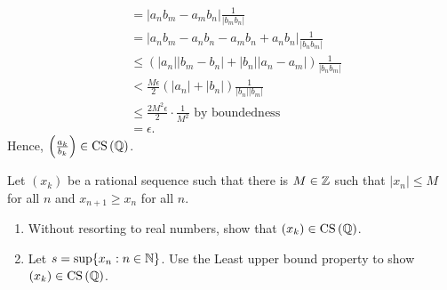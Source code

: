 \documentclass[a4paper]{article}
\begin{document}
\begin{solution}
\begin{enumerate}
\begin{align*}
											 &= \left| a_{n}b_{m}- a_{m}b_{n} \right|\frac{1}{\left|b_{m}b_{n}\right|}\\
											 &= \left| a_{n}b_{m} - a_{n}b_{n} - a_{m}b_{n} + a_{n}b_{n} \right| \frac{1}{\left|b_{n}b_{m}\right|}\\
											 &\le \left( \left| a_{n} \right| \left| b_{m} - b_{n} \right| + \left| b_{n} \right| \left| a_{n} - a_{m} \right| \right) \frac{1}{\left| b_{n}b_{m} \right| }\\
											 &< \frac{M\epsilon}{2}\left(\left| a_{n} \right| + \left| b_{n} \right|  \right) \frac{1}{\left| b_{n} \right| \left|b_{m} \right| }\\
											 &\le \frac{2M^2\epsilon}{2} \cdot \frac{1}{M^2} \text{ by boundedness}\\
											 &= \epsilon
			.\end{align*}
			Hence, \(\left( \frac{a_{k}}{b_{k}} \right) \in \operatorname{CS} \left( \mathbb{Q} \right) \).
	\end{enumerate}
\end{solution}
\newpage
\begin{problem}[11]
	Let \(\left( x_{k} \right) \) be a rational sequence such that there is \(M \in \mathbb{Z}\) such that \(\left| x_{n} \right|\le M \) for all \(n\) and \(x_{n+1}\ge x_{n}\) for all \(n\).
	\begin{enumerate}
		\item Without resorting to real numbers, show that \(\left( x_{k} \right) \in \operatorname{CS} \left( \mathbb{Q} \right)  \).
		\item Let \(s = \sup \{x_{n} : n \in \mathbb{N}\} \). Use the Least upper bound property to show \(\left( x_{k} \right) \in \operatorname{CS} \left( \mathbb{Q} \right) \).
	\end{enumerate}
\end{problem}
\end{document}
